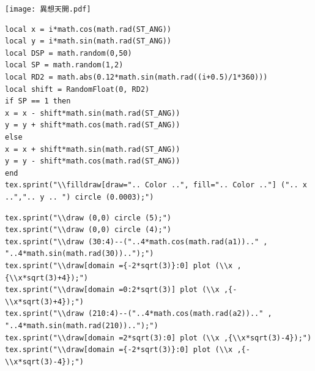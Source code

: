 \newpage
\begin{center}
\begin{figboxs}
\centering
\texttt{[image: 異想天開.pdf]}
\end{figboxs}
\end{center}
\newpage
\newpage
\begin{center}
\begin{figboxs}
\begin{footnotesize}
\begin{verbatim}
local x = i*math.cos(math.rad(ST_ANG))
local y = i*math.sin(math.rad(ST_ANG))
local DSP = math.random(0,50)
local SP = math.random(1,2)
local RD2 = math.abs(0.12*math.sin(math.rad((i+0.5)/1*360)))
local shift = RandomFloat(0, RD2)
if SP == 1 then
x = x - shift*math.sin(math.rad(ST_ANG))
y = y + shift*math.cos(math.rad(ST_ANG))
else
x = x + shift*math.sin(math.rad(ST_ANG))
y = y - shift*math.cos(math.rad(ST_ANG))
end
tex.sprint("\\filldraw[draw=".. Color ..", fill=".. Color .."] (".. x ..",".. y .. ") circle (0.0003);")
\end{verbatim}
\end{footnotesize}
\end{figboxs}
\end{center}
\begin{center}
\begin{figboxs}
\centering
{}
\end{figboxs}
\end{center}
\newpage
\newpage
\begin{center}
\begin{figboxs}
\begin{footnotesize}
\begin{verbatim}
tex.sprint("\\draw (0,0) circle (5);")
tex.sprint("\\draw (0,0) circle (4);")
tex.sprint("\\draw (30:4)--("..4*math.cos(math.rad(a1)).." , "..4*math.sin(math.rad(30))..");")
tex.sprint("\\draw[domain ={-2*sqrt(3)}:0] plot (\\x ,{\\x*sqrt(3)+4});")
tex.sprint("\\draw[domain =0:2*sqrt(3)] plot (\\x ,{-\\x*sqrt(3)+4});")
tex.sprint("\\draw (210:4)--("..4*math.cos(math.rad(a2)).." , "..4*math.sin(math.rad(210))..");")
tex.sprint("\\draw[domain =2*sqrt(3):0] plot (\\x ,{\\x*sqrt(3)-4});")
tex.sprint("\\draw[domain ={-2*sqrt(3)}:0] plot (\\x ,{-\\x*sqrt(3)-4});")
\end{verbatim}
\end{footnotesize}
\end{figboxs}
\end{center}
